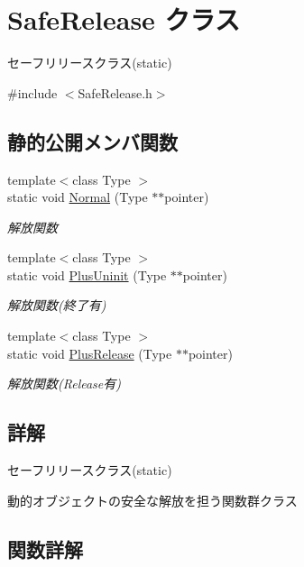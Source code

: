 \hypertarget{class_safe_release}{}\section{Safe\+Release クラス}
\label{class_safe_release}


セーフリリースクラス(static)  




{\ttfamily \#include $<$Safe\+Release.\+h$>$}

\subsection*{静的公開メンバ関数}
\begin{DoxyCompactItemize}
\item 
{\footnotesize template$<$class Type $>$ }\\static void \mbox{\hyperlink{class_safe_release_a6ecab682df939c28d8867a67c2f4b51f}{Normal}} (Type $\ast$$\ast$pointer)
\begin{DoxyCompactList}\small\item\em 解放関数 \end{DoxyCompactList}\item 
{\footnotesize template$<$class Type $>$ }\\static void \mbox{\hyperlink{class_safe_release_a06160f5466a88f021e6f28489de9df1e}{Plus\+Uninit}} (Type $\ast$$\ast$pointer)
\begin{DoxyCompactList}\small\item\em 解放関数(終了有) \end{DoxyCompactList}\item 
{\footnotesize template$<$class Type $>$ }\\static void \mbox{\hyperlink{class_safe_release_a507950335a85da67c1722cce83dca9ae}{Plus\+Release}} (Type $\ast$$\ast$pointer)
\begin{DoxyCompactList}\small\item\em 解放関数(Release有) \end{DoxyCompactList}\end{DoxyCompactItemize}


\subsection{詳解}
セーフリリースクラス(static) 

動的オブジェクトの安全な解放を担う関数群クラス 

\subsection{関数詳解}
\mbox{\label{class_safe_release_a6ecab682df939c28d8867a67c2f4b51f}} 

